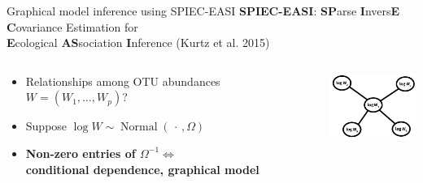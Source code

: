 \documentclass[professionalfonts]{beamer}
\newcommand{\N}{\operatorname{Normal}}
\begin{document}
\begin{frame}{Graphical model inference using SPIEC-EASI}
\textbf{SPIEC-EASI}: \textbf{SP}arse \textbf{I}nvers\textbf{E} \textbf{C}ovariance Estimation for \\ \textbf{E}cological \textbf{AS}sociation \textbf{I}nference (Kurtz et al. 2015)
\begin{columns}
\begin{column}{0.6\textwidth}
\begin{itemize}
\item Relationships among OTU abundances $W = (W_1, \dots, W_p)$?
\item Suppose $\log W \sim \N(\,\cdot\,, \Omega)$
\item \textbf{Non-zero entries of $\Omega^{-1} \Leftrightarrow$ \\ conditional dependence, graphical model}
\end{itemize}
\end{column}
\begin{column}{0.4\textwidth}
\begin{center}
\includegraphics[width=110px]{figs/graph-model-log.pdf}
\end{center}
\end{column}
\end{columns}
\end{frame}
\end{document}

